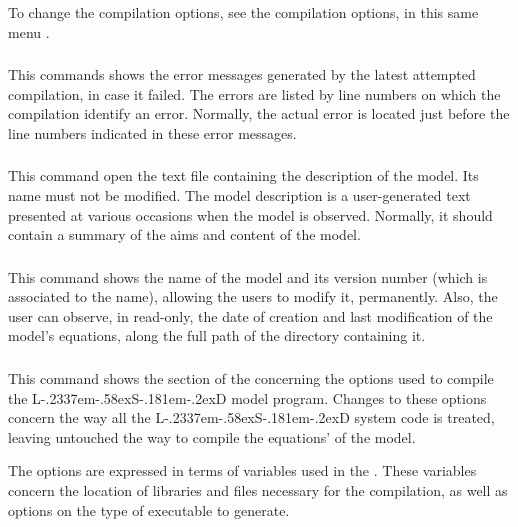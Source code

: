 \documentclass [11pt,a4paper] {book}
\def\LsD{{L\kern-.2337em\lower-.58ex\hbox{S}\kern-.181em\lower-.2ex\hbox{D}}\xspace}
\begin{document}
To change the compilation options, see the compilation options, in this same menu .

\subsubsection{}

This commands shows the error messages generated by the latest attempted compilation, in case it failed. The errors are listed by line numbers on which the compilation identify an error. Normally, the actual error is located just before the line numbers indicated in these error messages.

\subsubsection{}

This command open the text file containing the description of the model. Its name must not be modified. The model description is a user-generated text presented at various occasions when the model is observed. Normally, it should contain a summary of the aims and content of the model.

\subsubsection{}

This command shows the name of the model and its version number (which is associated to the name), allowing the users to modify it, permanently. Also, the user can observe, in read-only, the date of creation and last modification of the model's equations, along the full path of the directory containing it.

\subsubsection{}

This command shows the section of the  concerning the options used to compile the \LsD model program. Changes to these options concern the way all the \LsD system code is treated, leaving untouched the way to compile the equations' of the model.

The options are expressed in terms of variables used in the . These variables concern the location of libraries and files necessary for the compilation, as well as options on the type of executable to generate.
\end{document}

